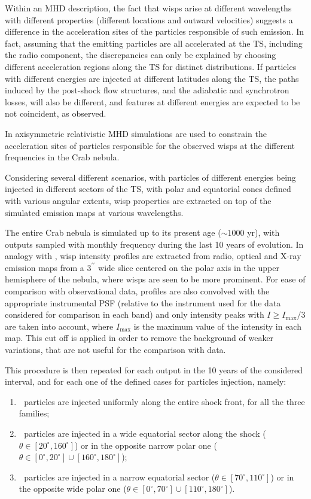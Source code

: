 Within an MHD description, the fact that wisps arise at different wavelengths with different properties (different locations and outward velocities) suggests a difference in the acceleration sites of the particles responsible of such emission.
In fact, assuming that the emitting particles are all accelerated at the TS, including the radio component, the discrepancies can only be explained by choosing different acceleration regions along the TS for distinct distributions. 
If particles with different energies are injected at different latitudes along the TS, the paths induced by the post-shock flow structures, and the adiabatic and synchrotron losses, will also be different, and features at different energies are expected to be not coincident, as observed.

In \citet{Olmi:2015} axisymmetric relativistic  MHD simulations are used to constrain the acceleration sites of particles responsible for the observed wisps at the different frequencies in the Crab nebula. 

Considering several different scenarios, with particles of different energies being injected in different sectors of the TS, with polar and equatorial cones defined with various angular extents, wisp properties are extracted on top of the simulated emission maps at various wavelengths.

The entire Crab nebula is simulated up to its present age ($\sim 1000$ yr), with outputs sampled with monthly frequency during the last 10 years of evolution. 
In analogy with \citet{Schweizer:2013}, wisp intensity profiles are extracted from radio, optical and X-ray emission maps from a $3^{\prime\prime}$ wide slice centered on the polar axis in the upper hemisphere of the nebula, where wisps are seen to be more prominent.
For ease of comparison with observational data, profiles are also convolved with the appropriate instrumental PSF (relative to the instrument used for the data considered for comparison in each band) and only intensity peaks with $I\geq I_\mathrm{max}/3$ are taken into account, where $I_\mathrm{max}$ is the maximum value of the intensity in each map. 
This cut off is applied in order to remove the background of weaker variations, that are not useful for the comparison with data. 

This procedure is then repeated for each output in the 10 years of the considered interval, and for each one of the defined cases for particles injection, namely:
\begin{enumerate}[(1)]
	\item  $\;$ particles are injected uniformly along the entire shock front, for all the three families;
	\item  $\;$ particles are injected in a wide equatorial sector along the shock ($\theta \in \left[ 20^\circ, 160^\circ \right]$) or in the opposite narrow polar one ($\theta \in \left[ 0^\circ, 20^\circ \right]\cup\left[ 160^\circ, 180^\circ \right]$);
	\item  $\;$ particles are injected in a narrow equatorial sector ($\theta \in \left[ 70^\circ, 110^\circ \right]$) or in the opposite wide polar one ($\theta \in \left[ 0^\circ, 70^\circ \right]\cup\left[ 110^\circ, 180^\circ \right]$).
\end{enumerate}

